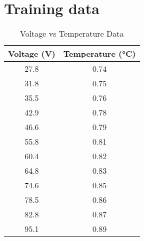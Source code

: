 \documentclass[a4paper,12pt]{article}
\begin{document}
\centering
\section{Training data}
\begin{table}[h!]
\centering
\caption{Voltage vs Temperature Data}
\begin{tabular}{|c|c|}
\hline
\textbf{Voltage (V)} & \textbf{Temperature (°C)} \\
\hline
27.8 & 0.74 \\
31.8 & 0.75 \\
35.5 & 0.76 \\
42.9 & 0.78 \\
46.6 & 0.79 \\
55.8 & 0.81 \\
60.4 & 0.82 \\
64.8 & 0.83 \\
74.6 & 0.85 \\
78.5 & 0.86 \\
82.8 & 0.87 \\
95.1 & 0.89 \\
\hline
\end{tabular}
\end{table}
\end{document}
